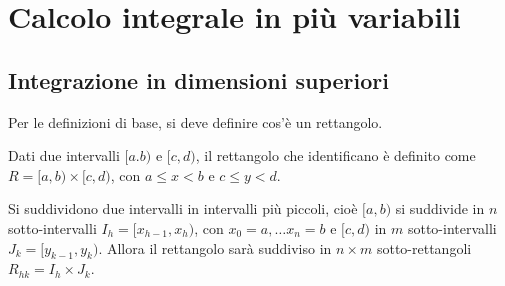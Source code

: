 \documentclass[10pt, a4paper]{scrartcl}
\theoremstyle{definition}
\numberwithin{esempio}{section}
\theoremstyle{definition}
\numberwithin{obs}{section}
\numberwithin{nota}{section}
\numberwithin{equation}{subsection}
\begin{document}
\newpage 

\section{Calcolo integrale in pi\`u variabili}

\subsection{Integrazione in dimensioni superiori}
Per le definizioni di base, si deve definire cos'\`e un rettangolo.
\begin{definizione}
	{}{}
	Dati due intervalli $[a.b)$ e $[c,d)$, il rettangolo che identificano \`e definito come $R = [a,b) \times  [c,d)$, con $a\le x< b$ e $c\le y<d$.
\end{definizione}
\noindent Si suddividono due intervalli in intervalli pi\`u piccoli, cio\`e $[a,b)$ si suddivide in $n$ sotto-intervalli $I_h = [x_{h-1} ,x_h)$, con $x_0 =a , \ldots x_n = b$ e $[c,d)$ in $m$ sotto-intervalli $J_k = [y_{k-1} ,y_k)$. Allora il rettangolo sar\`a suddiviso in $n\times m$ sotto-rettangoli $R_{hk}  = I_h \times J_k$.
\end{document}
